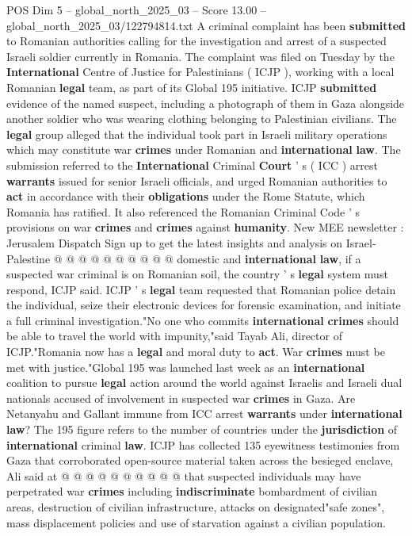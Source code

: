 \begin{textsample}{POS Dim 5 – global\_north\_2025\_03 – Score 13.00 – global\_north\_2025\_03/122794814.txt}  \label{ex:f5_pos_206}
A criminal complaint has been \textbf{submitted} to Romanian authorities calling for the investigation and arrest of a suspected Israeli soldier currently in Romania.
The complaint was filed on Tuesday by the \textbf{International} Centre of Justice for Palestinians ( ICJP ), working with a local Romanian \textbf{legal} team, as part of its Global 195 initiative.
ICJP \textbf{submitted} evidence of the named suspect, including a photograph of them in Gaza alongside another soldier who was wearing clothing belonging to Palestinian civilians.
The \textbf{legal} group alleged that the individual took part in Israeli military operations which may constitute war \textbf{crimes} under Romanian and \textbf{international} \textbf{law}.
The submission referred to the \textbf{International} Criminal \textbf{Court} ' s ( ICC ) arrest \textbf{warrants} issued for senior Israeli officials, and urged Romanian authorities to \textbf{act} in accordance with their \textbf{obligations} under the Rome Statute, which Romania has ratified.
It also referenced the Romanian Criminal Code ' s provisions on war \textbf{crimes} and \textbf{crimes} against \textbf{humanity}.
New MEE newsletter : Jerusalem Dispatch Sign up to get the latest insights and analysis on Israel-Palestine @ @ @ @ @ @ @ @ @ @ domestic and \textbf{international} \textbf{law}, if a suspected war criminal is on Romanian soil, the country ' s \textbf{legal} system must respond, ICJP said.
ICJP ' s \textbf{legal} team requested that Romanian police detain the individual, seize their electronic devices for forensic examination, and initiate a full criminal investigation."No one who commits \textbf{international} \textbf{crimes} should be able to travel the world with impunity,"said Tayab Ali, director of ICJP."Romania now has a \textbf{legal} and moral duty to \textbf{act}.
War \textbf{crimes} must be met with justice."Global 195 was launched last week as an \textbf{international} coalition to pursue \textbf{legal} action around the world against Israelis and Israeli dual nationals accused of involvement in suspected war \textbf{crimes} in Gaza.
Are Netanyahu and Gallant immune from ICC arrest \textbf{warrants} under \textbf{international} \textbf{law}?
The 195 figure refers to the number of countries under the \textbf{jurisdiction} of \textbf{international} criminal \textbf{law}.
ICJP has collected 135 eyewitness testimonies from Gaza that corroborated open-source material taken across the besieged enclave, Ali said at @ @ @ @ @ @ @ @ @ @ that suspected individuals may have perpetrated war \textbf{crimes} including \textbf{indiscriminate} bombardment of civilian areas, destruction of civilian infrastructure, attacks on designated"safe zones", mass displacement policies and use of starvation against a civilian population.

\end{textsample}
